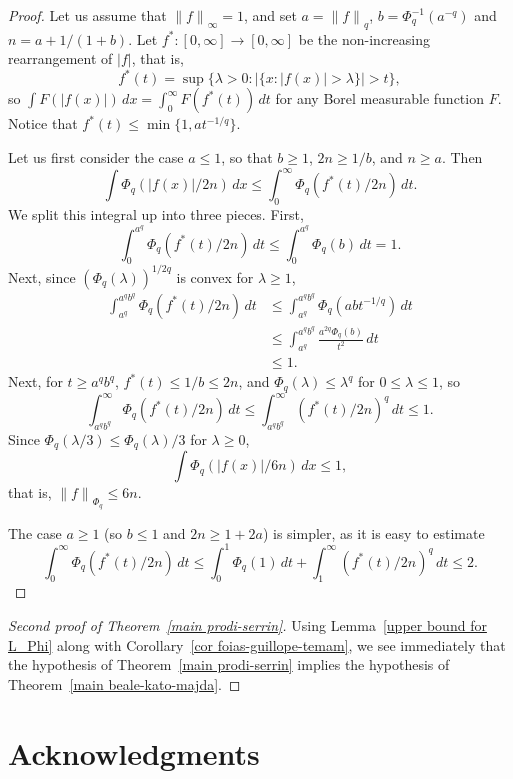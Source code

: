 \documentclass[12pt]{amsart}
\theoremstyle{remark}
\newcommand{\modo}[1]{{\left|#1\right|}}
\newcommand{\smodo}[1]{{\mathopen|#1\mathclose|}}
\newcommand{\snormo}[1]{{\mathopen\|#1\mathclose\|}}
\begin{document}
\begin{proof}
Let us assume that $\snormo f_\infty = 1$, 
and set $a = \snormo f_q$, $b = \Phi_q^{-1}(a^{-q})$ and
$n = a+1/(1+b)$.  
Let $f^*:[0,\infty]\to[0,\infty]$ be the non-increasing rearrangement
of $\modo{f}$, that is,
$$ f^*(t) =  
   \sup \{ \lambda>0 : \smodo{\{ x:\smodo{f(x)}>\lambda\}} > t \} ,$$
so $\int F(\modo{f(x)}) \, dx = \int_0^\infty F(f^*(t)) \, dt$ for any
Borel measurable function $F$.  Notice that $f^*(t) \le \min\{1,a t^{-1/q}\}$.

Let us first
consider the case $a \le 1$, so that $b \ge 1$, $2n \ge 1/b$, and
$n \ge a$.
Then
$$
   \int \Phi_q(\modo{f(x)}/2n) \, dx
   \le
   \int_0^\infty \Phi_q(f^*(t)/2n) \, dt .$$
We split this integral up into three pieces.  First,
$$ 
   \int_0^{a^q} \Phi_q(f^*(t)/2n) \, dt 
   \le
   \int_0^{a^q} \Phi_q(b) \, dt 
   = 1.
$$
Next, since $(\Phi_q(\lambda))^{1/2q}$ is convex for $\lambda \ge 1$,
\begin{align*}
   \int_{a^q}^{a^q b^q} \Phi_q(f^*(t)/2n) \, dt 
   &\le
   \int_{a^q}^{a^q b^q} \Phi_q(abt^{-1/q}) \, dt \\
   &\le 
   \int_{a^q}^{a^q b^q} \frac{a^{2q}\Phi_q(b)}{t^2} \, dt  \\
   &\le 1.
\end{align*}
Next, for $t \ge a^q b^q$, $f^*(t) \le 1/b \le 2n$, and
$\Phi_q(\lambda) \le \lambda^q$ for $0 \le \lambda \le 1$, so
$$
   \int_{a^q b^q}^\infty \Phi_q(f^*(t)/2n) \, dt 
   \le
   \int_{a^q b^q}^\infty (f^*(t)/2n)^q \, dt 
   \le 1.
$$
Since $\Phi_q(\lambda/3) \le \Phi_q(\lambda)/3$ for
$\lambda\ge0$,
$$
   \int \Phi_q(\modo{f(x)}/6n) \, dx
   \le 1 ,
$$
that is, $\snormo f_{\Phi_q} \le 6 n$.

The case $a \ge 1$ (so $b \le 1$ and $2n \ge 1+2a$) is simpler, as
it is easy to estimate
$$
   \int_0^\infty \Phi_q(f^*(t)/2n) \, dt 
   \le
   \int_0^1 \Phi_q(1) \, dt 
   +
   \int_1^\infty (f^*(t)/2n)^q \, dt 
   \le 2.
$$

\end{proof}

\begin{proof}[Second proof of Theorem~\ref{main prodi-serrin}]
Using Lemma~\ref{upper bound for L_Phi} along with 
Corollary~\ref{cor foias-guillope-temam}, we see immediately
that the hypothesis of Theorem~\ref{main prodi-serrin} implies the
hypothesis of Theorem~\ref{main beale-kato-majda}.
\end{proof}

\section*{Acknowledgments}
\end{document}
